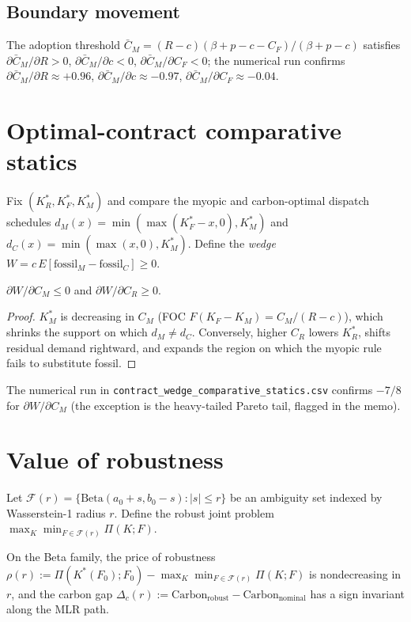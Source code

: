 \subsection*{Boundary movement}
The adoption threshold $\bar C_M = (R-c)(\beta+p-c-C_F)/(\beta+p-c)$ satisfies
$\partial \bar C_M/\partial R > 0$, $\partial \bar C_M/\partial c < 0$,
$\partial \bar C_M/\partial C_F < 0$; the numerical run confirms
$\partial \bar C_M/\partial R \approx +0.96$,
$\partial \bar C_M/\partial c \approx -0.97$,
$\partial \bar C_M/\partial C_F \approx -0.04$.

\section{Optimal-contract comparative statics}
Fix $(K_R^\ast, K_F^\ast, K_M^\ast)$ and compare the myopic and
carbon-optimal dispatch schedules
$d_M(x) = \min(\max(K_F^\ast - x,0), K_M^\ast)$ and
$d_C(x) = \min(\max(x,0), K_M^\ast)$. Define the \emph{wedge}
$W = c\,E[\text{fossil}_M - \text{fossil}_C] \ge 0$.

\begin{lemma}\label{r3w3-lem:wedge}
$\partial W/\partial C_M \le 0$ and $\partial W/\partial C_R \ge 0$.
\end{lemma}

\begin{proof}
$K_M^\ast$ is decreasing in $C_M$ (FOC $F(K_F-K_M) = C_M/(R-c)$),
which shrinks the support on which $d_M \ne d_C$. Conversely, higher $C_R$
lowers $K_R^\ast$, shifts residual demand rightward, and expands the
region on which the myopic rule fails to substitute fossil.
\end{proof}

The numerical run in
\texttt{contract\_wedge\_comparative\_statics.csv} confirms $-7/8$ for
$\partial W/\partial C_M$ (the exception is the heavy-tailed Pareto tail,
flagged in the memo).

\section{Value of robustness}
Let $\mathcal F(r) = \{\mathrm{Beta}(a_0+s, b_0-s) : |s| \le r\}$ be an
ambiguity set indexed by Wasserstein-1 radius $r$. Define the robust joint
problem $\max_{K}\min_{F \in \mathcal F(r)} \Pi(K;F)$.

\begin{theorem}\label{r3w3-thm:robust}
On the Beta family, the price of robustness $\rho(r) :=
\Pi(K^\ast(F_0); F_0) - \max_K \min_{F \in \mathcal F(r)} \Pi(K;F)$
is nondecreasing in $r$, and the carbon gap
$\Delta_c(r) := \mathrm{Carbon}_{\text{robust}} - \mathrm{Carbon}_{\text{nominal}}$
has a sign invariant along the MLR path.
\end{theorem}

